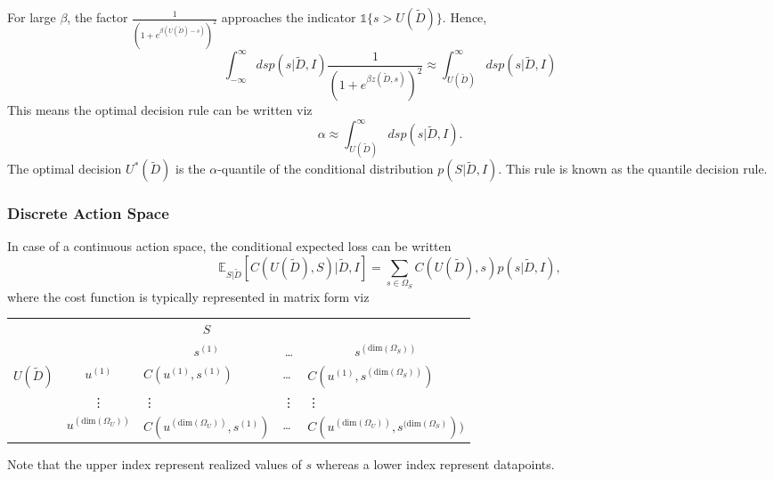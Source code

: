 \begin{example}
	For large $\beta$, the factor $\frac{1}{(1+e^{\beta (U(\tilde{D})-s)})^2}$ approaches the indicator $\mathbb{1}\{s>U(\tilde{D})\}$. Hence,
	\begin{equation}
		\int_{-\infty}^{\infty} ds p(s|\tilde{D},I)\frac{1}{(1+e^{\beta z(\tilde{D},s)})^2} \approx \int_{U(\tilde{D})}^{\infty} ds p(s|\tilde{D},I)
	\end{equation}
	This means the optimal decision rule can be written viz
	\begin{equation}
		\alpha \approx \int_{U(\tilde{D})}^{\infty} ds p(s|\tilde{D},I).
		\label{eq:quantile_decision_rule}
	\end{equation}
	The optimal decision $U^*(\tilde{D})$ is the $\alpha$-quantile of the conditional distribution $p(S|\tilde{D},I)$. This rule is known as the quantile decision rule.
\end{example}

\subsubsection{Discrete Action Space}
In case of a continuous action space, the conditional expected loss can be written
\begin{equation}
	\mathbb{E}_{S|\tilde{D}}[C(U(\tilde{D}), S)|\tilde{D},I] = \sum_{s\in \Omega_S}C(U(\tilde{D}),s)p(s|\tilde{D},I),
	\label{eq:conditional_cost_discrete}
\end{equation}
where the cost function is typically represented in matrix form viz
\begin{center}
	\begin{tabular}{ c  c  c  c  c  }
		&& $S$& & \\
		&& $s^{(1)}$ & \dots & $s^{(\text{dim}(\Omega_S))}$ \\
		\cline{3-5}
		$U(\tilde{D})$ & $u^{(1)}$& \multicolumn{1}{|l}{$C(u^{(1)}, s^{(1)})$} &\multicolumn{1}{l}{\dots}&\multicolumn{1}{l|}{$C(u^{(1)}, s^{(\text{dim}(\Omega_S))})$} \\
		& \vdots & \multicolumn{1}{|l}{\vdots} &\multicolumn{1}{l}{\vdots}&\multicolumn{1}{l|}{\vdots} \\
		& $u^{(\text{dim}(\Omega_U))}$ & \multicolumn{1}{|l}{$C(u^{(\text{dim}(\Omega_U))}, s^{(1)})$} &\multicolumn{1}{l}{\dots}&\multicolumn{1}{l|}{$C(u^{(\text{dim}(\Omega_U))}, s^{(\text{dim}(\Omega_S)}))$} \\
		\cline{3-5}
	\end{tabular}
\end{center}
Note that the upper index represent realized values of $s$ whereas a lower index represent datapoints.

